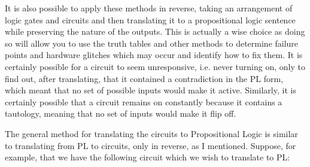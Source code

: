 It is also possible to apply these methods in reverse, taking an arrangement of logic gates and circuits and then translating it to a propositional logic sentence while preserving the nature of the outputs. This is actually a wise choice as doing so will allow you to use the truth tables and other methods to determine failure points and hardware glitches which may occur and identify how to fix them. It is certainly possible for a circuit to seem unresponsive, i.e. never turning on, only to find out, after translating, that it contained a contradiction in the PL form, which meant that no set of possible inputs would make it active. Similarly, it is certainly possible that a circuit remains on constantly because it contains a tautology, meaning that no set of inputs would make it flip off. 

The general method for translating the circuits to Propositional Logic is similar to translating from PL to circuits, only in reverse, as I mentioned. Suppose, for example, that we have the following circuit which we wish to translate to PL:


